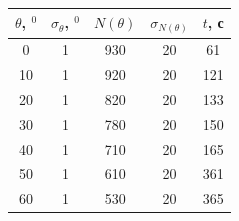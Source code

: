 \documentclass[a4paper, 12pt]{article}%
\begin{document}
\begin{table}[h!]
\begin{center}
\begin{tabular}{|c|c|c|c|c|}
\hline
$\theta$, $^0$ & $\sigma_{\theta}$, $^0$        & $N(\theta)$                                                            & $\sigma_{N(\theta)}$                                            & $t$, с                                                                   \\ \hline
0              & 1                                               & 930                                                                    & 20                                                              & 61                                                                       \\ \hline
10             & 1                                               & 920                                                                    & 20                                                              & 121                                                                      \\ \hline
20             & 1                                               & 820                                                                    & 20                                                              & 133                                                                      \\ \hline
30             & 1                                               & 780                                                                    & 20                                                              & 150                                                                      \\ \hline
40             & 1                                               & 710                                                                    & 20                                                              & 165                                                                      \\ \hline
50             & 1                                               & 610                                                                    & 20                                                              & 361                                                                      \\ \hline
60             & 1                                               & 530                                                                    & 20                                                              & 365                                                                      \\ \hline

\end{tabular}
\end{center}
\end{table}
\end{document}
